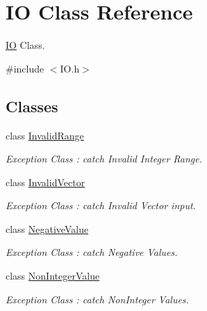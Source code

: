 \hypertarget{classIO}{}\section{IO Class Reference}
\label{classIO}


\mbox{\hyperlink{classIO}{IO}} Class.  




{\ttfamily \#include $<$I\+O.\+h$>$}

\subsection*{Classes}
\begin{DoxyCompactItemize}
\item 
class \mbox{\hyperlink{classIO_1_1InvalidRange}{Invalid\+Range}}
\begin{DoxyCompactList}\small\item\em Exception Class \+: catch Invalid Integer Range. \end{DoxyCompactList}\item 
class \mbox{\hyperlink{classIO_1_1InvalidVector}{Invalid\+Vector}}
\begin{DoxyCompactList}\small\item\em Exception Class \+: catch Invalid Vector input. \end{DoxyCompactList}\item 
class \mbox{\hyperlink{classIO_1_1NegativeValue}{Negative\+Value}}
\begin{DoxyCompactList}\small\item\em Exception Class \+: catch Negative Values. \end{DoxyCompactList}\item 
class \mbox{\hyperlink{classIO_1_1NonIntegerValue}{Non\+Integer\+Value}}
\begin{DoxyCompactList}\small\item\em Exception Class \+: catch Non\+Integer Values. \end{DoxyCompactList}\end{DoxyCompactItemize}
